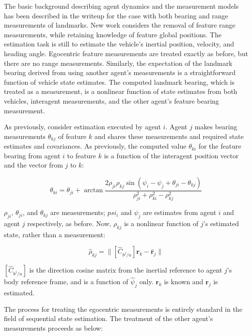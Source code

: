\documentclass{aiaa-tc}
\newcommand{\B}[1]{\textbf{#1}} %
\begin{document}
The basic background describing agent dynamics and the measurement models has been described in the writeup for the case with both bearing and range measurements of landmarks. New work considers the removal of feature range measurements, while retaining knowledge of feature global positions. The estimation task is still to estimate the vehicle's inertial position, velocity, and heading angle. Egocentric feature measurements are treated exactly as before, but there are no range measurements. Similarly, the expectation of the landmark bearing derived from using another agent's measurements is a straightforward function of vehicle state estimates. The computed landmark bearing, which is treated as a measurement, is a nonlinear function of state estimates from both vehicles, interagent measurements, and the other agent's feature bearing measurement.

As previously, consider estimation executed by agent $i$. Agent $j$ makes bearing measurements $\theta_{kj}$ of feature $k$ and shares these measurements and required state estimates and covariances. As previously, the computed value $\theta_{ki}$ for the feature bearing from agent $i$ to feature $k$ is a function of the interagent position vector and the vector from $j$ to $k$:

\begin{equation}
\theta_{ki} = \theta_{ji} + \arctan{\frac{ 2\rho_{ji}\rho_{kj}\sin{(\psi_i - \psi_j + \theta_{ji} - \theta_{kj})} }{ \rho_{ji}^2 + \rho_{ki}^2 - \rho_{kj}^2 } }
\label{eq:thetaki}
\end{equation}

$\rho_{ji}$, $\theta_{ji}$, and $\theta_{kj}$ are measurements; $psi_i$ and $\psi_j$ are estimates from agent $i$ and agent $j$ respectively, as before. Now, $\rho_{kj}$ is a nonlinear function of $j$'s estimated state, rather than a measurement:

\begin{equation}
\hat{\rho}_{kj} = \| [\hat{C}_{b^j/n}]\B{r}_k - \hat{\B{r}}_j \|
\label{eq:rhokj}
\end{equation}

$[\hat{C}_{b^j/n}]$ is the direction cosine matrix from the inertial reference to agent $j$'s body reference frame, and is a function of $\hat{\psi}_j$ only. $\B{r}_k$ is known and $\B{r}_j$ is estimated.

The process for treating the egocentric measurements is entirely standard in the field of sequential state estimation. The treatment of the other agent's measurements proceeds as below:
\end{document}
